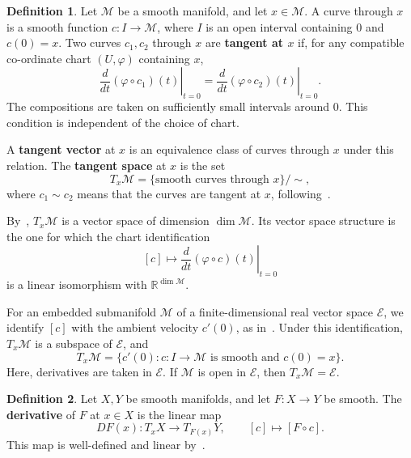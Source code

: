 \documentclass[12pt]{article}
\theoremstyle{definition}
\newtheorem{definition}{Definition}[section]
\theoremstyle{plain}
\theoremstyle{remark}
\newcommand{\R}{\mathbb{R}}
\begin{document}
\begin{definition}\label{def:tangent-space}
  Let \( \mathcal{M} \) be a smooth manifold, and let \( x \in \mathcal{M} \). A curve through \( x \) is a smooth function \( c : I \longrightarrow \mathcal{M} \), where \( I \) is an open interval containing \( 0 \) and \( c(0) = x \).
  Two curves \( c_1, c_2 \) through \( x \) are \textbf{tangent at \( x \)} if, for any compatible co-ordinate chart \( (U, \varphi) \) containing \( x \),
  \[
    \left.\frac{d}{dt}(\varphi \circ c_1)(t)\right|_{t=0} = \left.\frac{d}{dt}(\varphi \circ c_2)(t)\right|_{t=0}.
  \]
  The compositions are taken on sufficiently small intervals around \( 0 \).
  This condition is independent of the choice of chart.

  A \textbf{tangent vector} at \( x \) is an equivalence class of curves through \( x \) under this relation.
  The \textbf{tangent space} at \( x \) is the set
  \[
    T_x\mathcal{M} = \{\text{smooth curves through } x\}/\!\sim,
  \]
  where \( c_1 \sim c_2 \) means that the curves are tangent at \( x \), following~\cite[Definitions 5.4--5.5]{segal}.
\end{definition}

By~\cite[Proposition 5.8]{segal}, \( T_x\mathcal{M} \) is a vector space of dimension \( \dim\mathcal{M} \). Its vector space structure is the one for which the chart identification
\[
  [c] \longmapsto \left.\frac{d}{dt}(\varphi \circ c)(t)\right|_{t=0}
\]
is a linear isomorphism with \( \R^{\dim\mathcal{M}} \).

For an embedded submanifold \( \mathcal{M} \) of a finite-dimensional real vector space \( \mathcal{E} \), we identify \( [c] \) with the ambient velocity \( c'(0) \), as in~\cite[Section 5.2]{segal}. Under this identification, \( T_x\mathcal{M} \) is a subspace of \( \mathcal{E} \), and
\[
  T_x\mathcal{M} = \{c'(0) : c : I \longrightarrow \mathcal{M} \text{ is smooth and } c(0) = x\}.
\]
Here, derivatives are taken in \( \mathcal{E} \).
If \( \mathcal{M} \) is open in \( \mathcal{E} \), then \( T_x\mathcal{M} = \mathcal{E} \).

\begin{definition}\label{def:derivative}
  Let \( X, Y \) be smooth manifolds, and let \( F : X \longrightarrow Y \) be smooth.
  The \textbf{derivative} of \( F \) at \( x \in X \) is the linear map
  \[
    DF(x) : T_xX \longrightarrow T_{F(x)}Y, \qquad [c] \longmapsto [F \circ c].
  \]
  This map is well-defined and linear by~\cite[Proposition 5.10]{segal}.
\end{definition}
\end{document}
